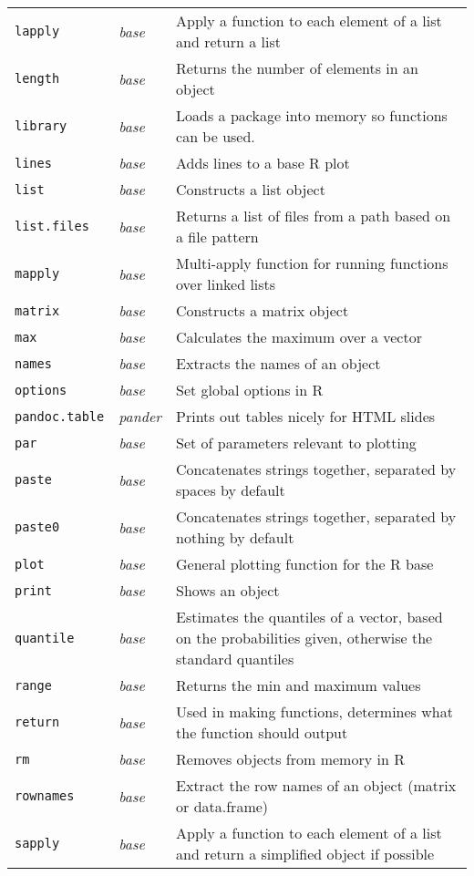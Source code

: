 \documentclass[10pt,landscape]{article}
\newcommand{\code}[1]{\texttt{#1}}
\newcommand{\pkg}[1]{\emph{#1}}
\begin{document}
\begin{tabular}{lll}
\code{lapply} & \pkg{base} & Apply a function to each element of a list and return a list \\
\code{length} & \pkg{base} & Returns the number of elements in an object\\
\code{library} & \pkg{base} & Loads a package into memory so functions can be used. \\
\code{lines} & \pkg{base} & Adds lines to a base R plot \\
\code{list} & \pkg{base} & Constructs a list object \\
\code{list.files} & \pkg{base} & Returns a list of files from a path based on a file pattern \\
\code{mapply} & \pkg{base} & Multi-apply function for running functions over linked lists \\
\code{matrix} & \pkg{base} & Constructs a matrix object \\
\code{max} & \pkg{base} & Calculates the maximum over a vector \\
\code{names} & \pkg{base} & Extracts the names of an object \\
\code{options} & \pkg{base} & Set global options in R\\
\code{pandoc.table} & \pkg{pander} & Prints out tables nicely for HTML slides \\
\code{par} & \pkg{base} & Set of parameters relevant to plotting \\
\code{paste} & \pkg{base} & Concatenates strings together, separated by spaces by default \\
\code{paste0} & \pkg{base} & Concatenates strings together, separated by nothing by default  \\
\code{plot} & \pkg{base} & General plotting function for the R base \\
\code{print} & \pkg{base} & Shows an object \\
\code{quantile} & \pkg{base} & Estimates the quantiles of a vector, based on the probabilities given, otherwise the standard quantiles \\
\code{range} & \pkg{base} & Returns the min and maximum values \\
\code{return} & \pkg{base} & Used in making functions, determines what the function should output \\
\code{rm} & \pkg{base} & Removes objects from memory in R\\
\code{rownames} & \pkg{base} & Extract the row names of an object (matrix or data.frame) \\
\code{sapply} & \pkg{base} & Apply a function to each element of a list and return a simplified object if possible \\

\end{tabular}
\end{document}
